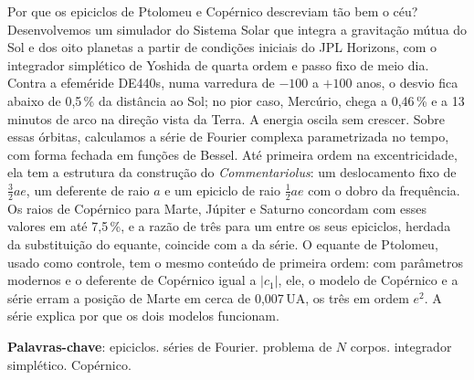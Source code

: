 \setlength{\absparsep}{12pt}
\begin{resumo}
Por que os epiciclos de Ptolomeu e Copérnico descreviam tão bem o céu? Desenvolvemos um simulador do Sistema Solar que integra a gravitação mútua do Sol e dos oito planetas a partir de condições iniciais do JPL Horizons, com o integrador simplético de Yoshida de quarta ordem e passo fixo de meio dia. Contra a efeméride DE440s, numa varredura de $-100$ a $+100$ anos, o desvio fica abaixo de 0,5\,\% da distância ao Sol; no pior caso, Mercúrio, chega a 0,46\,\% e a 13 minutos de arco na direção vista da Terra. A energia oscila sem crescer. Sobre essas órbitas, calculamos a série de Fourier complexa parametrizada no tempo, com forma fechada em funções de Bessel. Até primeira ordem na excentricidade, ela tem a estrutura da construção do \emph{Commentariolus}: um deslocamento fixo de $\tfrac{3}{2}ae$, um deferente de raio $a$ e um epiciclo de raio $\tfrac{1}{2}ae$ com o dobro da frequência. Os raios de Copérnico para Marte, Júpiter e Saturno concordam com esses valores em até 7,5\,\%, e a razão de três para um entre os seus epiciclos, herdada da substituição do equante, coincide com a da série. O equante de Ptolomeu, usado como controle, tem o mesmo conteúdo de primeira ordem: com parâmetros modernos e o deferente de Copérnico igual a $|c_1|$, ele, o modelo de Copérnico e a série erram a posição de Marte em cerca de 0,007\,UA, os três em ordem $e^2$. A série explica por que os dois modelos funcionam.

\textbf{Palavras-chave}: epiciclos. séries de Fourier. problema de $N$ corpos. integrador simplético. Copérnico.
\end{resumo}
